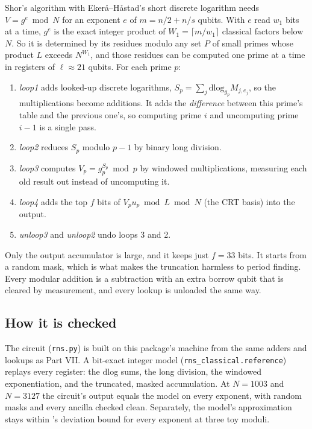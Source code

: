 \documentclass[11pt]{article}
\theoremstyle{plain}
\theoremstyle{remark}
\begin{document}
Shor's algorithm with Eker\aa{}--H\aa{}stad's short discrete logarithm needs $V=g^e\bmod N$ for an
exponent $e$ of $m=n/2+n/s$ qubits. With $e$ read $w_1$ bits at a time, $g^e$ is the exact integer
product of $W_1=\lceil m/w_1\rceil$ classical factors below $N$. So it is determined by its residues
modulo any set $P$ of small primes whose product $L$ exceeds $N^{W_1}$, and those residues can be
computed one prime at a time in registers of $\ell\approx21$ qubits. For each prime $p$:
\begin{enumerate}\setlength\itemsep{1pt}
\item \emph{loop1} adds looked-up discrete logarithms, $S_p=\sum_j\mathrm{dlog}_{g_p}M_{j,e_j}$, so the
multiplications become additions. It adds the \emph{difference} between this prime's table and the
previous one's, so computing prime $i$ and uncomputing prime $i-1$ is a single pass.
\item \emph{loop2} reduces $S_p$ modulo $p-1$ by binary long division.
\item \emph{loop3} computes $V_p=g_p^{S_p}\bmod p$ by windowed multiplications, measuring each
old result out instead of uncomputing it.
\item \emph{loop4} adds the top $f$ bits of $V_p u_p\bmod L\bmod N$ (the CRT basis) into the output.
\item \emph{unloop3} and \emph{unloop2} undo loops 3 and 2.
\end{enumerate}
Only the output accumulator is large, and it keeps just $f=33$ bits. It starts from a random mask,
which is what makes the truncation harmless to period finding. Every modular addition is a
subtraction with an extra borrow qubit that is cleared by measurement, and every lookup is
unloaded the same way.

\subsection{How it is checked}

The circuit (\texttt{rns.py}) is built on this package's machine from the same adders and lookups
as Part VII. A bit-exact integer model (\texttt{rns\_classical.reference}) replays every register:
the dlog sums, the long division, the windowed exponentiation, and the truncated, masked
accumulation. At $N=1003$ and $N=3127$ the circuit's output equals the model on every exponent,
with random masks and every ancilla checked clean. Separately, the model's approximation stays
within \cite{ec:gidney25rsa}'s deviation bound for every exponent at three toy moduli.
\end{document}
